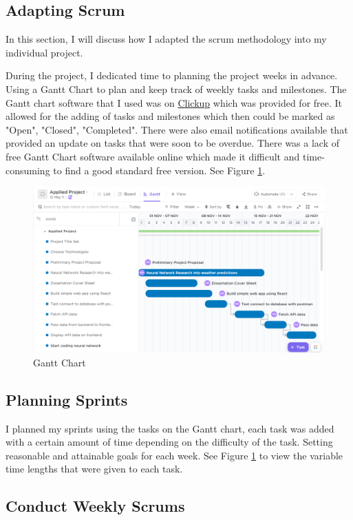 \subsection{Adapting Scrum}
In this section, I will discuss how I adapted the scrum methodology into my individual project. 

During the project, I dedicated time to planning the project weeks in advance. Using a Gantt Chart to plan and keep track of weekly tasks and milestones. The Gantt chart software that I used was on \href{https://app.clickup.com}{Clickup} which was provided for free. It allowed for the adding of tasks and milestones which then could be marked as "Open", "Closed", "Completed". There were also email notifications available that provided an update on tasks that were soon to be overdue. There was a lack of free Gantt Chart software available online which made it difficult and time-consuming to find a good standard free version. See Figure \ref{Gantt}.

\begin{figure}[h]
\centering
\includegraphics[scale=0.4]{img/GanttChart.PNG}
\caption{Gantt Chart}
\label{Gantt}
\end{figure}

\subsection{Planning Sprints}

I planned my sprints using the tasks on the Gantt chart, each task was added with a certain amount of time depending on the difficulty of the task. Setting reasonable and attainable goals for each week. See Figure \ref{Gantt} to view the variable time lengths that were given to each task.

\subsection{Conduct Weekly Scrums}

